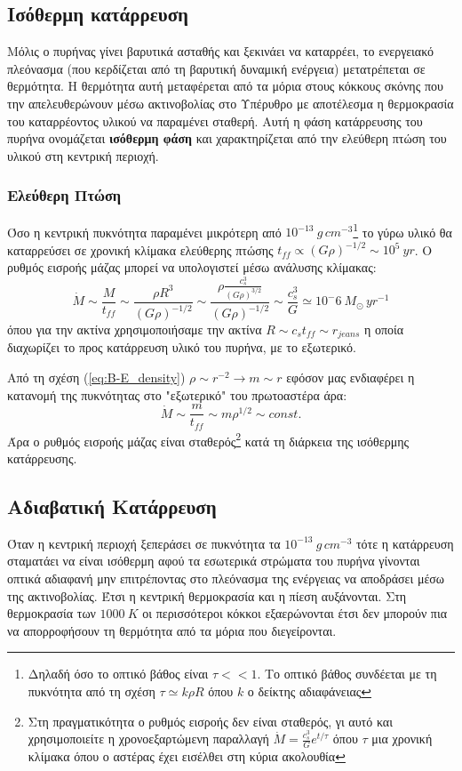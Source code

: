 \documentclass[a4paper,12pt]{memoir}
\begin{document}
\subsection{Ισόθερμη κατάρρευση}
Μόλις ο πυρήνας γίνει βαρυτικά ασταθής και ξεκινάει να καταρρέει, το ενεργειακό πλεόνασμα (που κερδίζεται από τη βαρυτική δυναμική ενέργεια) μετατρέπεται σε θερμότητα.
Η θερμότητα αυτή μεταφέρεται από τα μόρια στους κόκκους σκόνης που την απελευθερώνουν μέσω ακτινοβολίας στο Υπέρυθρο με αποτέλεσμα η θερμοκρασία του καταρρέοντος υλικού να παραμένει σταθερή. Αυτή η φάση κατάρρευσης του πυρήνα ονομάζεται \textbf{ισόθερμη φάση} και χαρακτηρίζεται από την ελεύθερη πτώση του υλικού στη κεντρική περιοχή.

\subsubsection{Ελεύθερη Πτώση}
Όσο η κεντρική πυκνότητα παραμένει μικρότερη από $10^{-13} \ g \, cm^{-3}$\footnote{Δηλαδή όσο το οπτικό βάθος είναι $\tau<<1$. Το οπτικό βάθος συνδέεται με τη πυκνότητα από τη σχέση $\tau \simeq k \rho R$ όπου $k$ ο δείκτης αδιαφάνειας} το γύρω υλικό θα καταρρεύσει σε χρονική κλίμακα ελεύθερης πτώσης $t_{ff} \propto (G \rho)^{-1/2} \sim 10^5 \ yr$. 
Ο ρυθμός εισροής μάζας μπορεί να υπολογιστεί μέσω ανάλυσης κλίμακας: 
\begin{equation}
\dot{M} \sim \frac{M}{t_{ff}} \sim \frac{\rho R^3}{(G \rho)^{-1/2}} \sim \frac{\rho \frac{c_s ^3}{(G \rho)^{3/2}}}{(G \rho)^{-1/2}} \sim \frac{c_s ^3}{G} \simeq 10^-6 \  M_{\odot} \, yr^{-1} 
\end{equation}
όπου για την ακτίνα χρησιμοποιήσαμε την ακτίνα $R \sim c_s t_{ff} \sim r_{jeans}$ η οποία διαχωρίζει το προς κατάρρευση υλικό του πυρήνα, με το εξωτερικό.


Από τη σχέση (\ref{eq:B-E_density}) $\rho \sim r^{-2} \rightarrow m \sim r$ εφόσον μας ενδιαφέρει η κατανομή της πυκνότητας στο "εξωτερικό" του πρωτοαστέρα άρα: 
\begin{equation}
\dot{M} \sim \frac{m}{t_{ff}} \sim m \rho^{1/2} \sim const.
\end{equation}
Άρα ο ρυθμός εισροής μάζας είναι σταθερός\footnote{Στη πραγματικότητα ο ρυθμός εισροής δεν είναι σταθερός, γι αυτό και χρησιμοποιείτε η χρονοεξαρτώμενη παραλλαγή $\dot{M}=\frac{c_s ^3}{G} e^{t/\tau}$ όπου $\tau$ μια χρονική κλίμακα όπου ο αστέρας έχει εισέλθει στη κύρια ακολουθία} κατά τη διάρκεια της ισόθερμης κατάρρευσης.

\subsection{Αδιαβατική Κατάρρευση}
Όταν η κεντρική περιοχή ξεπεράσει σε πυκνότητα τα $10^{-13} \ g \, cm^{-3}$ τότε η κατάρρευση σταματάει να είναι ισόθερμη αφού τα εσωτερικά στρώματα του πυρήνα γίνονται οπτικά αδιαφανή μην επιτρέποντας στο πλεόνασμα της ενέργειας να αποδράσει μέσω της ακτινοβολίας. Έτσι η κεντρική θερμοκρασία και η πίεση αυξάνονται.
Στη θερμοκρασία των $1000 \ K$ οι περισσότεροι κόκκοι εξαερώνονται έτσι δεν μπορούν πια να απορροφήσουν τη θερμότητα από τα μόρια που διεγείρονται.
\end{document}
